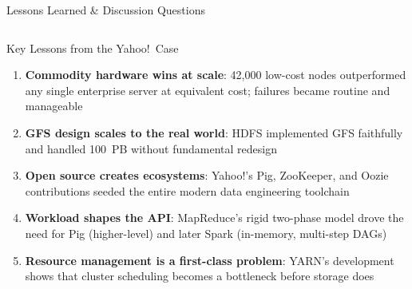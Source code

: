\documentclass[aspectratio=169,10pt]{beamer}
\begin{document}
\begin{frame}{Lessons Learned \& Discussion Questions}
  \begin{columns}[T]
      \begin{block}{Key Lessons from the Yahoo!\ Case}
        \begin{enumerate}
          \item \textbf{Commodity hardware wins at scale}:
                42{,}000 low-cost nodes outperformed any single
                enterprise server at equivalent cost;
                failures became routine and manageable
          \item \textbf{GFS design scales to the real world}:
                HDFS implemented GFS faithfully and handled
                100~PB without fundamental redesign
          \item \textbf{Open source creates ecosystems}:
                Yahoo!'s Pig, ZooKeeper, and Oozie contributions
                seeded the entire modern data engineering toolchain
          \item \textbf{Workload shapes the API}:
                MapReduce's rigid two-phase model drove the
                need for Pig (higher-level) and later Spark
                (in-memory, multi-step DAGs)
          \item \textbf{Resource management is a first-class problem}:
                YARN's development shows that cluster scheduling
                becomes a bottleneck before storage does
        \end{enumerate}
      \end{block}


\end{columns}
\end{frame}
\end{document}
